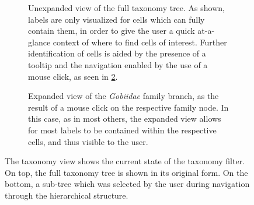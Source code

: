 \documentclass[letterpaper]{article} %
\begin{document}
\begin{figure}
  \begin{subfigure}[b]{\linewidth}
    \centering
    \caption{Unexpanded view of the full taxonomy tree.  As shown, labels are
      only visualized for cells which can fully contain them, in order to give
      the user a quick at-a-glance context of where to find cells of interest.
      Further identification of cells is aided by the presence of a tooltip and
    the navigation enabled by the use of a mouse click, as seen in
  \ref{fig:taxa_nav}.}
    \label{fig:taxa_full}
  \end{subfigure}
  \begin{subfigure}[b]{\linewidth}
    \centering
    \caption{Expanded view of the \emph{Gobiidae} family branch, as the result
    of a mouse click on the respective family node.  In this case, as in most
  others, the expanded view allows for most labels to be contained within the
respective cells, and thus visible to the user.}
    \label{fig:taxa_nav}
  \end{subfigure}
  \label{fig:taxa}
  \caption{The taxonomy view shows the current state of the taxonomy filter.
  On top, the full taxonomy tree is shown in its original form.  On the bottom,
a sub-tree which was selected by the user during navigation through the
hierarchical structure.}
\end{figure}
\end{document}

